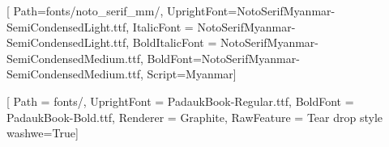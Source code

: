 [
    Path=fonts/noto_serif_mm/,
    UprightFont=NotoSerifMyanmar-SemiCondensedLight.ttf,
    ItalicFont = NotoSerifMyanmar-SemiCondensedLight.ttf,
    BoldItalicFont = NotoSerifMyanmar-SemiCondensedMedium.ttf,
    BoldFont=NotoSerifMyanmar-SemiCondensedMedium.ttf, Script=Myanmar]
\DeclareTextFontCommand{\textnotoserifmm}{\notoserifmmfamily}




[
        Path = fonts/,
        UprightFont = PadaukBook-Regular.ttf,
        BoldFont = PadaukBook-Bold.ttf, Renderer = Graphite, RawFeature = {Tear drop style washwe=True}]
\DeclareTextFontCommand{\textpadaukbook}{\padaukbook}







